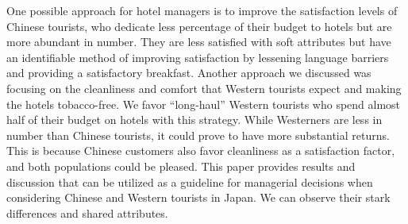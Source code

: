 \documentclass[smallextended,natbib]{svjour3}       %
\begin{document}
  One possible approach for hotel managers is to improve the satisfaction levels of Chinese tourists, who dedicate less percentage of their budget to hotels but are more abundant in number. They are less satisfied with soft attributes but have an identifiable method of improving satisfaction by lessening language barriers and providing a satisfactory breakfast. Another approach we discussed was focusing on the cleanliness and comfort that Western tourists expect and making the hotels tobacco-free. We favor ``long-haul'' Western tourists who spend almost half of their budget on hotels with this strategy. While Westerners are less in number than Chinese tourists, it could prove to have more substantial returns. This is because Chinese customers also favor cleanliness as a satisfaction factor, and both populations could be pleased. This paper provides results and discussion that can be utilized as a guideline for managerial decisions when considering Chinese and Western tourists in Japan. We can observe their stark differences and shared attributes. 

\end{document}
